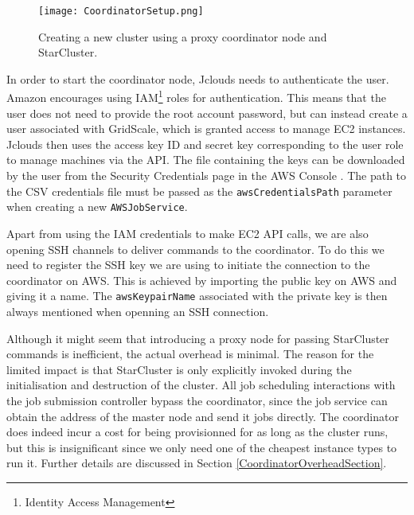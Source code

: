 

\begin{figure}[h]
	\centering
		\texttt{[image: CoordinatorSetup.png]}
	\caption{Creating a new cluster using a proxy coordinator node and StarCluster.}
	\label{CoordinatorSetup}
\end{figure}

In order to start the coordinator node, Jclouds needs to authenticate the user. Amazon encourages using IAM\footnote{Identity Access Management} roles for authentication. This means that the user does not need to provide the root account password, but can instead create a user associated with GridScale, which is granted access to manage EC2 instances. Jclouds then uses the access key ID and secret key corresponding to the user role to manage machines via the API. The file containing the keys can be downloaded by the user from the Security Credentials page in the AWS Console \cite{AWSCredentials}. The path to the CSV credentials file must be passed as the \verb|awsCredentialsPath| parameter when creating a new \verb|AWSJobService|.

Apart from using the IAM credentials to make EC2 API calls, we are also opening SSH channels to deliver commands to the coordinator. To do this we need to register the SSH key we are using to initiate the connection to the coordinator on AWS. This is achieved by importing the public key on AWS and giving it a name. The \verb|awsKeypairName| associated with the private key is then always mentioned when openning an SSH connection.

Although it might seem that introducing a proxy node for passing StarCluster commands is inefficient, the actual overhead is minimal. The reason for the limited impact is that StarCluster is only explicitly invoked during the initialisation and destruction of the cluster. All job scheduling interactions with the job submission controller bypass the coordinator, since the job service can obtain the address of the master node and send it jobs directly. The coordinator does indeed incur a cost for being provisionned for as long as the cluster runs, but this is insignificant since we only need one of the cheapest instance types to run it. Further details are discussed in Section \ref{CoordinatorOverheadSection}.


